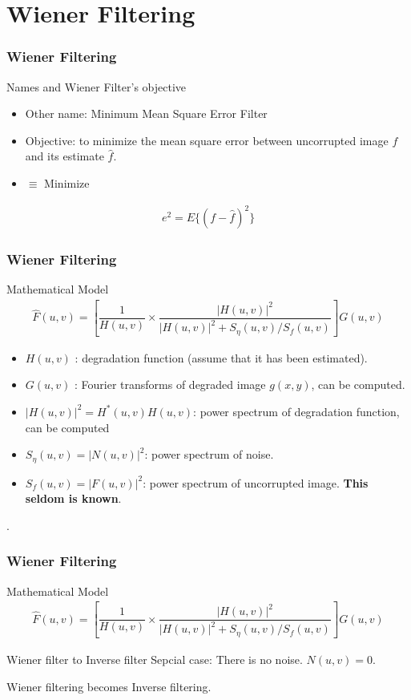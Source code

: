 \documentclass[english,11pt,table,handout]{beamer}
\begin{document}
\section{Wiener Filtering}
\frame
{
	\frametitle{Wiener Filtering }
	
	\begin{block}{Names and Wiener Filter's objective}
		\begin{itemize}
			\item Other name: Minimum Mean Square Error Filter
			\item Objective: to minimize the mean square error between uncorrupted image $f$ and its estimate $\hat{f}$.
			\item $\equiv$ Minimize 
		\end{itemize}
			\begin{align}
				\nonumber
				e^2 = E\{(f - \hat{f})^2\}
			\end{align}
	\end{block}

}
\frame
{
	\frametitle{Wiener Filtering }
	\small{
	\begin{block}{Mathematical Model}
		\begin{align}
			\nonumber
			\hat{F}(u,v) = \left[ \dfrac{1}{H(u,v)} \times 
				\dfrac{|H(u,v)|^2}{|H(u,v)|^2 + S_{\eta}(u,v)/S_{f}(u,v)}\right]G(u,v)
		\end{align}
	\end{block}
	
	\begin{block}{}
		\begin{itemize}
			\item $H(u,v)$ : degradation function (assume that it has been estimated).
			\item $G(u,v)$ : Fourier transforms of degraded image $g(x,y)$, can be computed.
			\item $|H(u,v)|^2 = H^{*}(u,v)H(u,v)$: power spectrum of degradation function, can be computed
			\item $S_{\eta}(u,v) = |N(u,v)|^2$: power spectrum of noise.
			\item $S_{f}(u,v) = |F(u,v)|^2$: power spectrum of uncorrupted image. \textbf{This seldom is  known}.
		\end{itemize}.
	\end{block}
}
}
\frame
{
	\frametitle{Wiener Filtering }
	\small{
	\begin{block}{Mathematical Model}
		\begin{align}
		\nonumber
		\hat{F}(u,v) = \left[ \dfrac{1}{H(u,v)} \times 
		\dfrac{|H(u,v)|^2}{|H(u,v)|^2 + S_{\eta}(u,v)/S_{f}(u,v)}\right]G(u,v)
		\end{align}
	\end{block}
	}
	
	\begin{block}{Wiener filter to Inverse filter}
		Sepcial case: There is no noise. $N(u,v) = 0$. 
		
		Wiener filtering becomes Inverse filtering.
		
	\end{block}
}
\end{document}
